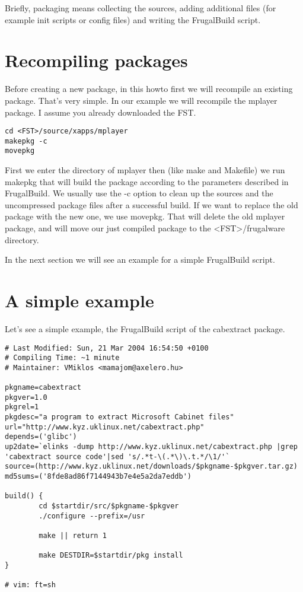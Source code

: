 Briefly, packaging means collecting the sources, adding additional files (for example init scripts or config files) and writing the FrugalBuild script.

\section{Recompiling packages}

Before creating a new package, in this howto first we will recompile an existing package. That's very simple. In our example we will recompile the mplayer package. I assume you already downloaded the FST.

\begin {verbatim}
cd <FST>/source/xapps/mplayer
makepkg -c
movepkg
\end{verbatim}

First we enter the directory of mplayer then (like make and Makefile) we run makepkg that will build the package according to the parameters described in FrugalBuild. We usually use the -c option to clean up the sources and the uncompressed package files after a successful build. If we want to replace the old package with the new one, we use movepkg. That will delete the old mplayer package, and will move our just compiled package to the <FST>/frugalware directory.

In the next section we will see an example for a simple FrugalBuild script.

\section{A simple example}
Let's see a simple example, the FrugalBuild script of the cabextract package.
\begin{verbatim}
# Last Modified: Sun, 21 Mar 2004 16:54:50 +0100
# Compiling Time: ~1 minute
# Maintainer: VMiklos <mamajom@axelero.hu>

pkgname=cabextract
pkgver=1.0
pkgrel=1
pkgdesc="a program to extract Microsoft Cabinet files"
url="http://www.kyz.uklinux.net/cabextract.php"
depends=('glibc')
up2date=`elinks -dump http://www.kyz.uklinux.net/cabextract.php |grep 'cabextract source code'|sed 's/.*t-\(.*\)\.t.*/\1/'`
source=(http://www.kyz.uklinux.net/downloads/$pkgname-$pkgver.tar.gz)
md5sums=('8fde8ad86f7144943b7e4e5a2da7eddb')

build() {
        cd $startdir/src/$pkgname-$pkgver
        ./configure --prefix=/usr
	
        make || return 1
	
        make DESTDIR=$startdir/pkg install
}

# vim: ft=sh
\end{verbatim}

